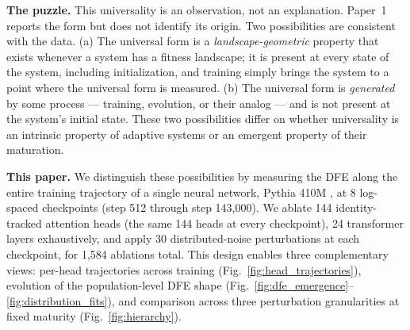 \documentclass{article}
\begin{document}
\textbf{The puzzle.} This universality is an observation, not an explanation. Paper~1 reports the form but does not identify its origin. Two possibilities are consistent with the data. (a) The universal form is a \emph{landscape-geometric} property that exists whenever a system has a fitness landscape; it is present at every state of the system, including initialization, and training simply brings the system to a point where the universal form is measured. (b) The universal form is \emph{generated} by some process --- training, evolution, or their analog --- and is not present at the system's initial state. These two possibilities differ on whether universality is an intrinsic property of adaptive systems or an emergent property of their maturation.

\textbf{This paper.} We distinguish these possibilities by measuring the DFE along the entire training trajectory of a single neural network, Pythia 410M \citep{biderman2023pythia}, at 8 log-spaced checkpoints (step 512 through step 143,000). We ablate 144 identity-tracked attention heads (the same 144 heads at every checkpoint), 24 transformer layers exhaustively, and apply 30 distributed-noise perturbations at each checkpoint, for 1,584 ablations total. This design enables three complementary views: per-head trajectories across training (Fig.~\ref{fig:head_trajectories}), evolution of the population-level DFE shape (Fig.~\ref{fig:dfe_emergence}--\ref{fig:distribution_fits}), and comparison across three perturbation granularities at fixed maturity (Fig.~\ref{fig:hierarchy}).
\end{document}
